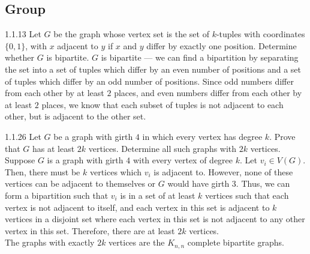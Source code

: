 \documentclass[9pt]{extarticle}
\begin{document}
\subsection*{Group}%
\begin{problem}{1.1.13}
    Let $G$ be the graph whose vertex set is the set of $k$-tuples with coordinates $\{0,1\}$, with $x$ adjacent to $y$ if $x$ and $y$ differ by exactly one position. Determine whether $G$ is bipartite.
    \tcblower
  $G$ is bipartite --- we can find a bipartition by separating the set into a set of tuples which differ by an even number of positions and a set of tuples which differ by an odd number of positions. Since odd numbers differ from each other by at least $2$ places, and even numbers differ from each other by at least $2$ places, we know that each subset of tuples is not adjacent to each other, but is adjacent to the other set. 
\end{problem}
\begin{problem}{1.1.26}
  Let $G$ be a graph with girth $4$ in which every vertex has degree $k$. Prove that $G$ has at least $2k$ vertices. Determine all such graphs with $2k$ vertices.
  \tcblower
  \noindent Suppose $G$ is a graph with girth $4$ with every vertex of degree $k$. Let $v_i\in V(G)$. Then, there must be $k$ vertices which $v_i$ is adjacent to. However, none of these vertices can be adjacent to themselves or $G$ would have girth $3$. Thus, we can form a bipartition such that $v_i$ is in a set of at least $k$ vertices such that each vertex is not adjacent to itself, and each vertex in this set is adjacent to $k$ vertices in a disjoint set where each vertex in this set is not adjacent to any other vertex in this set. Therefore, there are at least $2k$ vertices.\\

  \noindent The graphs with exactly $2k$ vertices are the $K_{n,n}$ complete bipartite graphs.
\end{problem}
\end{document}
